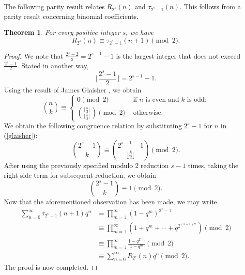 \documentclass[10pt]{article}
\newtheorem{theorem}{Theorem}[section]
\theoremstyle{definition}
\begin{document}
The following parity result relates $R_{2^s}(n)$ and $\tau_{2^s-1}(n)$. This follows from a parity result concerning binomial coefficients.
\begin{theorem}
For every positive integer $s$, we have
\begin{equation}
R_{2^s}(n)\equiv\tau_{2^s-1}(n+1)\pmod 2.
\end{equation}
\end{theorem}
\begin{proof}
We note that $\frac{2^s-2}{2}=2^{s-1}-1$ is the largest integer that does not exceed $\frac{2^s-1}{2}$. Stated in another way, 
\[
\lfloor\frac{2^s-1}{2}\rfloor=2^{s-1}-1. 
\]
Using the result of James Glaisher \cite{james}, we obtain
\begin{equation}\label{glaisher}
{n\choose{k}}\equiv\begin{cases}
0\pmod{2}&\text{ if $n$ is even and $k$ is odd;}\\
\binom{\lfloor\frac{n}{2}\rfloor}{\lfloor\frac{k}{2}\rfloor}\pmod{2}&\text{ otherwise.}
\end{cases}
\end{equation}
We obtain the following congruence relation by substituting $2^s-1$ for $n$ in (\ref{glaisher}): 
\[{{2^s-1}\choose{k}}\equiv{{2^{s-1}-1}\choose{\lfloor\frac{k}{2}\rfloor}}\pmod{2}.
\]
After using the previously specified modulo 2 reduction $s-1$ times, taking the right-side term for subsequent reduction, we obtain
\[{{2^s-1}\choose{k}}\equiv1\pmod{2}.
\]
Now that the aforementioned observation has been made, we may write
\begin{align*}
\sum_{n=0}^{\infty}\tau_{2^s-1}(n+1)q^n&=\prod_{m=1}^{\infty}(1-q^m)^{2^s-1}\\
&\equiv\prod_{m=1}^{\infty}(1+q^m+\cdots +q^{2^{{(s-1)}m}})\pmod{2}\\ 
&\equiv\prod_{m=1}^{\infty}\frac{1-q^{2^sm}}{1-q^m}\pmod{2}\\
&\equiv\sum_{n=0}^{\infty}R_{2^s}(n)q^n\pmod{2}.
\end{align*}
The proof is now completed.
\end{proof}
\end{document}
